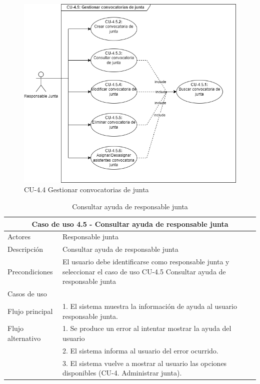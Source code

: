 \begin{figure}[H]
        \centering
        \includegraphics[scale=0.55]{img/diagramas/Funcional/CU-4.4.png}
        \caption{CU-4.4 Gestionar convocatorias de junta}
        \label{fig:Diagrama-Caso de uso 4.4 Gestionar convocatorias de junta}
    \end{figure}


\begin{table}[H]
    \caption{Consultar ayuda de responsable junta}
    \label{tab:CU-4.5}
    \begin{center}
        \begin{tabular}{|l|p{12cm}|}
            \hline
            \multicolumn{2}{|c|}{Caso de uso 4.5 - Consultar ayuda de responsable junta} \\ \hline 
            Actores                 &   Responsable junta          \\  
            \hline
            Descripción        & Consultar ayuda de responsable junta    \\ \hline 
            Precondiciones          &   El usuario debe identificarse  como responsable junta y seleccionar el caso de uso CU-4.5 Consultar ayuda de responsable junta         \\  \hline
            Casos de uso            &          \\ \hline
            Flujo principal         &   1. El sistema muestra la información de ayuda 
            al usuario responsable junta.     \\\hline
            Flujo alternativo    &   1. Se produce un error al intentar mostrar la ayuda del usuario \\ 
            & 2. El sistema informa al usuario del error ocurrido. \\ 
            & 3. El sistema vuelve a mostrar al usuario las opciones disponibles (CU-4. Administrar junta).\\  \hline
        \end{tabular}
    \end{center}
\end{table}


